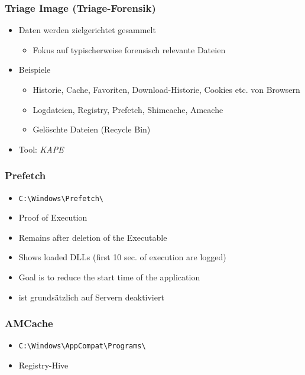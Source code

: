 \subsubsection{Triage Image (Triage-Forensik)}
\begin{itemize}
    \item Daten werden zielgerichtet gesammelt
    \begin{itemize}
        \item Fokus auf typischerweise forensisch relevante Dateien
    \end{itemize}
    \item Beispiele
    \begin{itemize}
        \item Historie, Cache, Favoriten, Download-Historie, Cookies etc. von Browsern
        \item Logdateien, Registry, Prefetch, Shimcache, Amcache
        \item Gelöschte Dateien (Recycle Bin)
    \end{itemize}
    \item Tool: \textit{KAPE}
\end{itemize}

\subsubsection{Prefetch}
\begin{itemize}
    \item \lstinline|C:\Windows\Prefetch\|
    \item Proof of Execution
    \item Remains after deletion of the Executable
    \item Shows loaded DLLs (first 10 sec. of execution are logged)
    \item Goal is to reduce the start time of the application
    \item ist grundsätzlich auf Servern deaktiviert
\end{itemize}

\subsubsection{AMCache}
\begin{itemize}
    \item \lstinline|C:\Windows\AppCompat\Programs\|
    \item Registry-Hive
\end{itemize}

